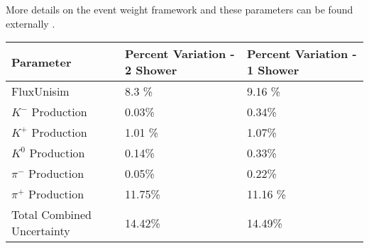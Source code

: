 \documentclass{article}
\begin{document}



\noindent More details on the event weight framework and these parameters can be found externally \cite{bib:flux_uncertainty_tn}.  


 
 \begin{table}[H]
 \centering
  \begin{tabular}{| l | l | l |}
  \hline
   Parameter & Percent Variation - 2 Shower & Percent Variation - 1 Shower  \\ [0.1ex] \hline
 FluxUnisim & 8.3 \% & 9.16 \%  \\
 $K^-$ Production & 0.03\% & 0.34\%\\
 $K^+$ Production &  1.01 \% & 1.07\% \\
 $K^0$ Production & 0.14\% & 0.33\% \\
 $\pi^-$ Production & 0.05\% & 0.22\%\\
 $\pi^+$ Production &  11.75\% & 11.16 \% \\ \hline
 Total Combined Uncertainty & 14.42\% & 14.49\%\\ \hline
\end{tabular}
\end{table}
\end{document}
